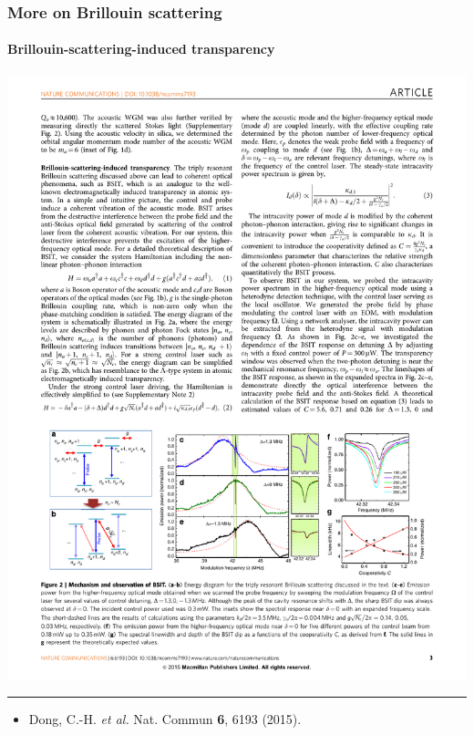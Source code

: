 \documentclass{beamer}
\def\etal{\emph{et al. }}
\begin{document}
\begin{frame}
\frametitle{More on Brillouin scattering}
\framesubtitle{Brillouin-scattering-induced transparency}
\vspace{3em}

\begin{center}
\includegraphics[width=1.0\columnwidth]{f8.pdf}
\end{center}

\vspace{3em}
\noindent\rule{0.1\textwidth}{0.5pt}

\begin{itemize}
\item \tiny{Dong, C.-H. \etal Nat. Commun \textbf{6}, 6193 (2015).

}
\end{itemize}
\end{frame}

\end{document}
